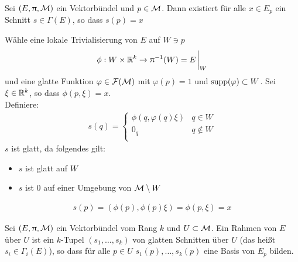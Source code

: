 \begin{lem}
\label{lem:existenzschnitt}
Sei $(E, \uppi, \mathcal{M})$ ein Vektorbündel und $p \in \mathcal{M}$.
Dann existiert für alle $x \in E_p$ ein Schnitt $s \in \Gamma (E)$, so dass $s(p)=x$
\end{lem}
\begin{bew}
Wähle eine lokale Trivialisierung von $E$ auf $W \ni p$
\begin{align*}
\phi: W \times \R^k \to \pi^{-1}(W) = E\eval_W
\end{align*}
und eine glatte Funktion $\varphi \in \mathcal{F}(\mathcal{M})$ mit $\varphi(p)=1$ und $\operatorname{supp}(\varphi) \subset W$.
Sei $\xi \in \mathbb{R}^k$, so dass $\phi (p, \xi)=x$.\\
Definiere:
\begin{align*}
s(q) = \left\{
\begin{array}{ll}
\phi(q, \varphi(q)\xi) & q\in W \\
0_q & q \not\in W \\
\end{array}
\right.
\end{align*}
$s$ ist glatt, da folgendes gilt:
\begin{itemize}
\item $s$ ist glatt auf $W$
\item $s$ ist $0$ auf einer Umgebung von $\mathcal{M} \setminus W$
\end{itemize}
\begin{align*}
s(p) = ( \phi(p), \phi(p) \xi ) = \phi (p , \xi) = x
\end{align*}
\end{bew}

\begin{defs}
Sei $(E, \uppi, \mathcal{M})$ ein Vektorbündel vom Rang $k$ und $U \subset \mathcal{M}$.
Ein Rahmen von $E$ über $U$ ist ein $k$-Tupel $(s_1, \dots, s_k)$ von glatten Schnitten über $U$ (das heißt $s_i \in \Gamma_i (E)$), so dass für alle $p \in U$
$s_1 (p), \dots, s_k (p)$ eine Basis von $E_p$ bilden.
\end{defs}